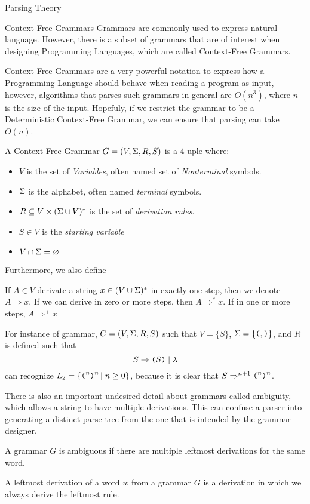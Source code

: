 \begin{section}{Parsing Theory}
\begin{subsection}{Context-Free Grammars}
Grammars are commonly used to express natural language. However, there is
a subset of grammars that are of interest when designing
Programming Languages, which are called Context-Free Grammars.

Context-Free Grammars are a very powerful notation to express how a Programming Language
should behave when reading a program as input, however, algorithms that parses
such grammars in general are $O(n^3)$, where $n$ is the size of the input. Hopefuly,
if we restrict the grammar to be a Deterministic Context-Free Grammar, we can ensure
that parsing can take $O(n)$.

\begin{definition}
A Context-Free Grammar $G = (V, \Sigma, R, S)$ is a 4-uple where:
\begin{itemize}
	\item $V$ is the set of \textit{Variables}, often named set of
	\textit{Nonterminal} symbols.
	\item $\Sigma$ is the alphabet, often named \textit{terminal} symbols.
	\item $R \subseteq V \times (\Sigma \cup V)^*$ is the set of \textit{derivation rules}.
	\item $S \in V$ is the \textit{starting variable}
	\item $V \cap \Sigma = \varnothing$
\end{itemize}
\end{definition}

Furthermore, we also define

\begin{definition}
	If $A \in V$ derivate a string $x \in (V \cup \Sigma)^*$ in exactly one step, then
	we denote $A \Rightarrow x$. If we can derive in zero or more steps, then
	$A \Rightarrow^* x$. If in one or more steps, $A \Rightarrow^+ x$
\end{definition}

For instance of grammar, $G = (V, \Sigma, R, S)$ such that
$V = \{S\}$, $\Sigma = \{\texttt{(}, \texttt{)}\}$, and $R$ is defined such that
$$S \rightarrow \texttt{(} S\texttt{)} \; | \; \lambda$$
can recognize $L_2 = \{\texttt{(}^n \texttt{)}^n\,|\;n \geq 0\}$, because it is clear that
$S \Rightarrow^{n+1} \texttt{(}^n\texttt{)}^n$.

There is also an important undesired detail about grammars called ambiguity, which
allows a string to have multiple derivations. This can confuse a parser into
generating a distinct parse tree from the one that is intended by the grammar
designer.

\begin{definition}
	A grammar $G$ is ambiguous if there are multiple leftmost derivations for the same
	word.
\end{definition}
\begin{definition}
	A leftmost derivation of a word $w$ from a grammar $G$ is a derivation
	in which we always derive the leftmost rule.
\end{definition}


\end{subsection}
\end{section}
